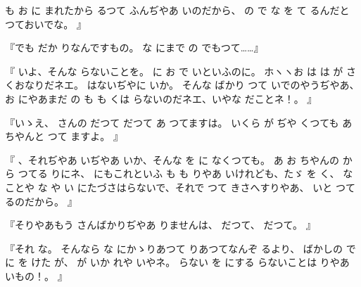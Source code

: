 も
お
に
まれたから
るつて
ふんぢやあ
いのだから、
の
で
な
を
て
るんだと
つておいでな。
』

『でも
だか
りなんですもの。
な
にまで
の
でもつて……』

『
いよ、そんな
らないことを。
に
お
で
いといふのに。
ホヽヽお
は
は
が
さくおなりだネエ。
はないぢやに
いか。
そんな
ばかり
つて
いでのやうぢやあ、
お
にやあまだ
の
も
も
くは
らないのだネエ、いやな
だことネ！。
』

『いゝえ、
さんの
だつて
だつて
あ
つてますは。
いくら
が
ぢや
くつても
あちやんと
つて
ますよ。
』

『
、それぢやあ
いぢやあ
いか、そんな
を
に
なくつても。
あ
お
ちやんの
から
つてる
りにネ、
にもこれといふ
も
も
りやあ
いけれども、たゞ
を
く、
なことや
な
や
い
にたづさはらないで、それで
つて
きさへすりやあ、
いと
つてるのだから。
』

『そりやあもう
さんばかりぢやあ
りませんは、
だつて、
だつて。
』

『それ
な。
そんなら
な
にかゝりあつて
りあつてなんぞ
るより、
ばかしの
で%
に
を
けた
が、
が
いか
れや
いやネ。
らない
を
にする
らないことは
りやあ
いもの！。
』

